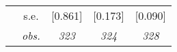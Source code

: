 \begin{table}[H]
\begin{centering}
\begin{tabular}{ r c ccc}
	 & s.e.	 & [0.861]	 & [0.173]	 & [0.090]	\\
	 & \textit{obs.}	 & \textit{323}	 & \textit{324}	 & \textit{328}	\\
\hline 
\end{tabular} 
\par\end{centering} 
\vspace{2ex}
\end{table}

